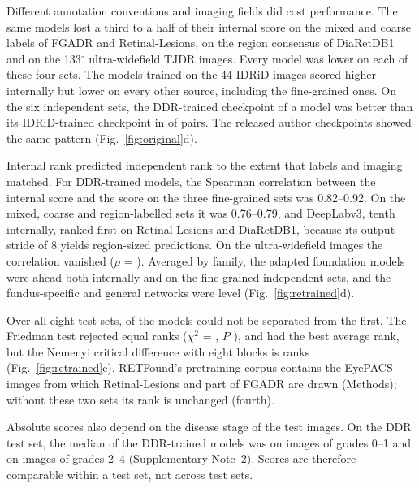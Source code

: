 Different annotation conventions and imaging fields did cost performance. The same models lost a third to a half of their internal score on the mixed and coarse labels of FGADR and Retinal-Lesions, on the region consensus of DiaRetDB1 and on the 133$^\circ$ ultra-widefield TJDR images. Every model was lower on each of these four sets. The models trained on the 44 IDRiD images scored higher internally but lower on every other source, including the fine-grained ones. On the six independent sets, the DDR-trained checkpoint of a model was better than its IDRiD-trained checkpoint in  of  pairs. The released author checkpoints showed the same pattern (Fig.~\ref{fig:original}d).

Internal rank predicted independent rank to the extent that labels and imaging matched. For DDR-trained models, the Spearman correlation between the internal score and the score on the three fine-grained sets was 0.82--0.92. On the mixed, coarse and region-labelled sets it was 0.76--0.79, and DeepLabv3, tenth internally, ranked first on Retinal-Lesions and DiaRetDB1, because its output stride of 8 yields region-sized predictions. On the ultra-widefield images the correlation vanished ($\rho$ = ). Averaged by family, the adapted foundation models were ahead both internally and on the fine-grained independent sets, and the fundus-specific and general networks were level (Fig.~\ref{fig:retrained}d).

Over all eight test sets,  of the  models could not be separated from the first. The Friedman test rejected equal ranks ($\chi^2$ = , $P$ ), and  had the best average rank, but the Nemenyi critical difference with eight blocks is  ranks (Fig.~\ref{fig:retrained}e). RETFound's pretraining corpus contains the EyePACS images from which Retinal-Lesions and part of FGADR are drawn (Methods); without these two sets its rank is unchanged (fourth).

Absolute scores also depend on the disease stage of the test images. On the DDR test set, the median \mAUPR{} of the DDR-trained models was  on images of grades 0--1 and  on images of grades 2--4 (Supplementary Note~2). Scores are therefore comparable within a test set, not across test sets.




